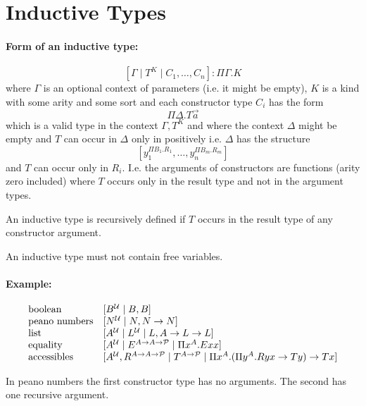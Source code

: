\section {Inductive Types}


\paragraph{Form of an inductive type:}
$$
    [\Gamma \mid T^K \mid C_1, \ldots, C_n] : \Pi \Gamma. K
$$
where $\Gamma$ is an optional context of parameters (i.e. it might be empty),
$K$ is a kind with some arity and some sort and each constructor type
$C_i$ has the form
$$
    \Pi \Delta. T \vec a
$$
which is a valid type in the context $\Gamma, T^K$
and
where the context $\Delta$ might be empty and $T$ can occur in $\Delta$ only in
positively i.e. $\Delta$ has the structure
$$
    [y_1^{\Pi B_1. R_1}, \ldots, y_n^{\Pi B_m. R_m}]
$$
and $T$ can occur only in $R_i$. I.e. the arguments of constructors are
functions (arity zero included) where $T$ occurs only in the result type and not
in the argument types.

An inductive type is recursively defined if $T$ occurs in the result type of any
constructor argument.

An inductive type must not contain free variables.


\paragraph{Example:}
$$
    \begin{array}{lll}
        \text{boolean}
        &
        [B^{\cal U} \mid B, B]
        \\
        \text{peano numbers}
        &
        [N^{\cal U} \mid N, N\to N]
        \\
        \text{list}
        &
        [A^{\cal U} \mid L^{\cal U} \mid L, A \to L\to L]
        \\
        \text{equality}
        &
        [A^{\cal U}
        \mid E^{A \to A \to {\cal P}}
        \mid \Pi x^A. E x x]
        \\
        \text{accessibles}
        &
        [
            A^{\cal U}, R^{A \to A \to {\cal P}}
            \mid
            T^{A \to {\cal P}}
            \mid
            \Pi x^A. (\Pi y^A. R y x \to T y) \to T x
        ]
    \end{array}
$$

In peano numbers the first constructor type has no arguments. The second has one
recursive argument.



